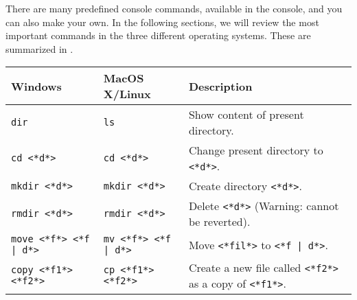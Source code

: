 \documentclass[fsharpNotes.tex]{subfiles}
\begin{document}
There are many predefined console commands, available in the console, and you can also make your own. In the following sections, we will review the most important commands in the three different operating systems. These are summarized in .
\begin{table}
  \centering
  \begin{tabularx}{\linewidth}{|l|l|>{\raggedright\arraybackslash}X|}
    \hline
    Windows & MacOS X/Linux & Description 
    \\ \hline\hline
    {\lstinline[language=syntax]!dir!}
            & {\lstinline[language=syntax]!ls!}
                            & Show content of present directory.
    \\ \hline
    {\lstinline[language=syntax]!cd <*d*>!} 
            &{\lstinline[language=syntax]!cd <*d*>!} 
                          & Change present directory to {\lstinline[language=syntax]!<*d*>!}. 
    \\ \hline
    {\lstinline[language=syntax]!mkdir <*d*>!}
            & {\lstinline[language=syntax]!mkdir <*d*>!}
                          & Create directory {\lstinline[language=syntax]!<*d*>!}. \\ \hline
    {\lstinline[language=syntax]!rmdir <*d*>!}
            & {\lstinline[language=syntax]!rmdir <*d*>!}
                          & Delete {\lstinline[language=syntax]!<*d*>!} (Warning: cannot be reverted). \\ \hline
    {\lstinline[language=syntax, keywords={}]!move <*f*> <*f | d*>!\hspace*{5mm}}%
            &{\lstinline[language=syntax, keywords={}]!mv <*f*> <*f | d*>!}
                          & Move {\lstinline[language=syntax]!<*fil*>!} to {\lstinline[language=syntax, keywords={}]!<*f | d*>!}. \\ \hline
    {\lstinline[language=syntax]!copy <*f1*> <*f2*>!}
            &{\lstinline[language=syntax]!cp <*f1*> <*f2*>!}
             & Create a new file called {\lstinline[language=syntax]!<*f2*>!} as a copy of {\lstinline[language=syntax]!<*f1*>!}. \\ \hline

\end{tabularx}
\end{table}
\end{document}
